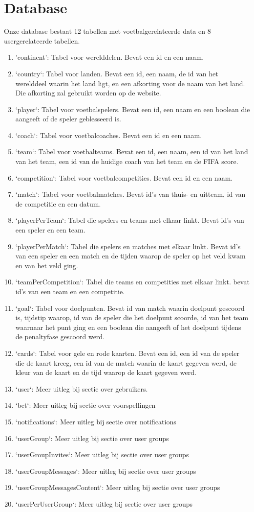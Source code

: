\documentclass[11pt, a4paper]{article}
\begin{document}
\section{Database}
Onze database bestaat 12 tabellen met voetbalgerelateerde data en 8 usergerelateerde tabellen.
\begin{enumerate}
\item 'continent': Tabel voor werelddelen. Bevat een id en een naam.
\item `country`: Tabel voor landen. Bevat een id, een naam, de id van het werelddeel waarin het land ligt, en een afkorting voor de naam van het land. Die afkorting zal gebruikt worden op de website.
\item `player`: Tabel voor voetbalspelers. Bevat een id, een naam en een boolean die aangeeft of de speler geblesseerd is.
\item `coach`: Tabel voor voetbalcoaches. Bevat een id en een naam.
\item `team`: Tabel voor voetbalteams. Bevat een id, een naam, een id van het land van het team, een id van de huidige coach van het team en de FIFA score.
\item `competition`: Tabel voor voetbalcompetities. Bevat een id en een naam.
\item `match`: Tabel voor voetbalmatches. Bevat id's van thuis- en uitteam, id van de competitie en een datum.
\item `playerPerTeam`: Tabel die spelers en teams met elkaar linkt. Bevat id's van een speler en een team.
\item `playerPerMatch`: Tabel die spelers en matches met elkaar linkt. Bevat id's van een speler en een match en de tijden waarop de speler op het veld kwam en van het veld ging.
\item `teamPerCompetition`: Tabel die teams en competities met elkaar linkt. bevat id's van een team en een competitie.
\item `goal`: Tabel voor doelpunten. Bevat id van match waarin doelpunt gescoord is, tijdstip waarop, id van de speler die het doelpunt scoorde, id van het team waarnaar het punt ging en een boolean die aangeeft of het doelpunt tijdens de penaltyfase gescoord werd.
\item `cards`: Tabel voor gele en rode kaarten. Bevat een id, een id van de speler die de kaart kreeg, een id van de match waarin de kaart gegeven werd, de kleur van de kaart en de tijd waarop de kaart gegeven werd.
\item `user`: Meer uitleg bij sectie over gebruikers.
\item `bet`: Meer uitleg bij sectie over voorspellingen
\item `notifications`: Meer uitleg bij sectie over notifications
\item `userGroup`: Meer uitleg bij sectie over user groups
\item `userGroupInvites`: Meer uitleg bij sectie over user groups
\item `userGroupMessages`: Meer uitleg bij sectie over user groups
\item `userGroupMessagesContent`: Meer uitleg bij sectie over user groups
\item `userPerUserGroup`: Meer uitleg bij sectie over user groups


\end{enumerate}
\end{document}
